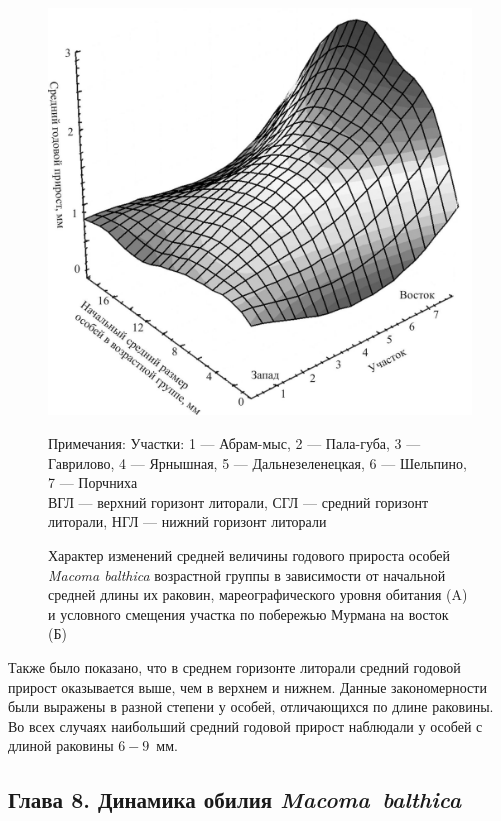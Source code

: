 {{\begin{figure}[]
\begin{minipage}[b]{.5\linewidth}
\begin{center}
				\includegraphics[width=\textwidth]{../Barenc_Sea/growth_from_MSc/prirost_otklik_geography.jpg}
			\end{center}
		\end{minipage}
	\caption{Характер изменений средней величины годового прироста особей {\it Macoma balthica} возрастной группы в зависимости от начальной средней длины их раковин, мареографического уровня обитания (A) и условного смещения участка по побережью Мурмана на восток (Б)}
\footnotesize{Примечания: Участки: 1 --- Абрам-мыс, 2 --- Пала-губа, 3 --- Гаврилово, 4 --- Ярнышная, 5 --- Дальнезеленецкая, 6 --- Шельпино, 7 --- Порчниха\\
ВГЛ --- верхний горизонт литорали, СГЛ --- средний горизонт литорали, НГЛ --- нижний горизонт литорали}
	\label{ris:prirost_otklik}
	\end{figure}
Также было показано, что в среднем горизонте литорали средний годовой прирост оказывается выше, чем в верхнем и нижнем.
Данные закономерности были выражены в разной степени у особей, отличающихся по длине раковины.
Во всех случаях наибольший средний годовой прирост наблюдали у особей с длиной раковины $6 - 9$~мм.



\subsection*{Глава 8. Динамика обилия \textit{Macoma~balthica}}

}}
